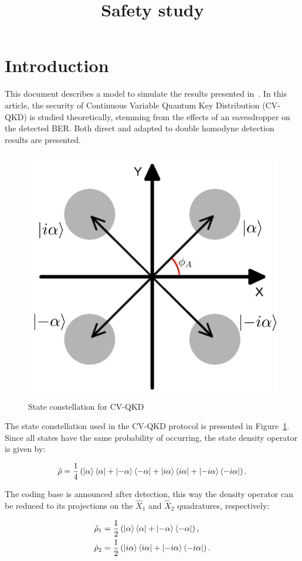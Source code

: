 \documentclass[a4paper]{article}
\title{Safety study}
\author{}
\date{}
\begin{document}
\maketitle

\section{Introduction}\label{sec:intro}

This document describes a model to simulate the results presented in~\cite{namiki2003security}. In this article, the security of Continuous Variable Quantum Key Distribution (CV-QKD) is studied theoretically, stemming from the effects of an eavesdropper on the detected BER. Both direct and adapted to double homodyne detection results are presented.

\begin{figure}[h]
\centering
\includegraphics[width=.5\linewidth]{constellation.png}
\caption{State constellation for CV-QKD}
\label{fig:const}
\end{figure}

The state constellation used in the CV-QKD protocol is presented in Figure~\ref{fig:const}. Since all states have the same probability of occurring, the state density operator is given by:

\begin{equation}\label{eq:statedensity}
\hat{\rho}=\frac{1}{4}\left(\ket{\alpha}\bra{\alpha}+\ket{-\alpha}\bra{-\alpha}+\ket{i\alpha}\bra{i\alpha}+\ket{-i\alpha}\bra{-i\alpha}\right).
\end{equation}

The coding base is announced after detection, this way the density operator can be reduced to its projections on the $\hat{X}_1$ and $\hat{X}_2$ quadratures, respectively:

\begin{align}
\hat{\rho}_1&=\frac{1}{2}\left(\ket{\alpha}\bra{\alpha}+\ket{-\alpha}\bra{-\alpha}\right),\label{eq:statedensity1} \\ 
\hat{\rho}_2&=\frac{1}{2}\left(\ket{i\alpha}\bra{i\alpha}+\ket{-i\alpha}\bra{-i\alpha}\right).\label{eq:statedensity2}
\end{align}
\end{document}
